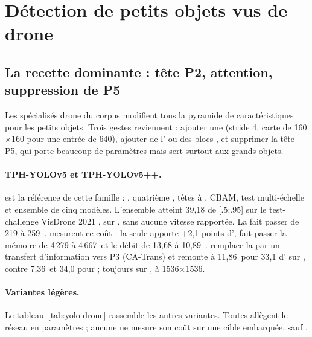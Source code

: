 \section{Détection de petits objets vus de drone}
\label{sec:detection}

\subsection{La recette dominante : tête P2, attention, suppression de P5}

Les  spécialisés drone du corpus modifient tous la pyramide de caractéristiques pour
les petits objets. Trois gestes reviennent : ajouter une  (stride 4, carte de
160$\times$160 pour une entrée de 640), ajouter de l' ou des blocs ,
et supprimer la tête P5, qui porte beaucoup de paramètres mais sert surtout aux grands
objets.

\paragraph{TPH-YOLOv5 et TPH-YOLOv5++.} 
\citep{arxiv-2108.11539-tph-yolov5-improved-yolov5-transformer}\pp{} est la référence de
cette famille : , quatrième , têtes à , CBAM, test multi-échelle
et ensemble de cinq modèles. L'ensemble atteint 39,18 de  [.5:.95] sur le
test-challenge VisDrone 2021 \med{}, sur , sans aucune vitesse rapportée.
La  fait passer  de 219 à 259\, . \citet{2023-zhao-tph-yolov5-boosting-object-detection}
mesurent ce coût : la  seule apporte +2,1 points d', fait passer la mémoire  de
4\,279 à 4\,667\, et le débit de 13,68 à 10,89\, .  remplace
la  par un transfert d'information vers P3 (CA-Trans) et remonte à 11,86\, pour
33,1 d' sur , contre 7,36\, et 34,0 pour   ; toujours
sur , à 1536$\times$1536.

\paragraph{Variantes légères.} Le tableau~\ref{tab:yolo-drone} rassemble les autres
variantes. Toutes allègent le réseau en paramètres ; aucune ne mesure son coût sur une
cible embarquée, sauf .

